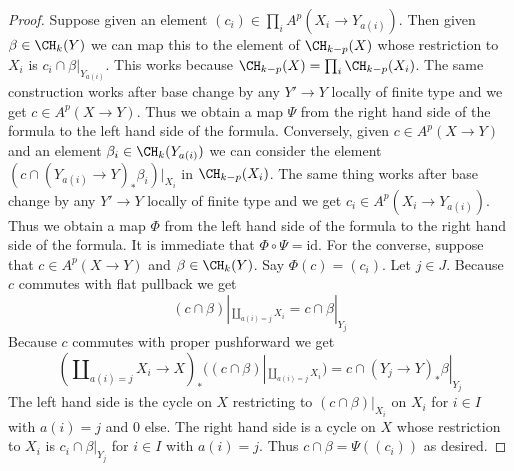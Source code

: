 \begin{proof}
Suppose given an element $(c_i) \in \prod_i A^p(X_i \to Y_{a(i)})$.
Then given $\beta \in \CH_k(Y)$ we can map this to the element of
$\CH_{k - p}(X)$ whose restriction to $X_i$ is $c_i \cap \beta|_{Y_{a(i)}}$.
This works because $\CH_{k - p}(X) = \prod_i \CH_{k - p}(X_i)$.
The same construction works after base change by any $Y' \to Y$
locally of finite type and we get $c \in A^p(X \to Y)$.
Thus we obtain a map $\Psi$ from the right hand side of the formula
to the left hand side of the formula.
Conversely, given $c \in A^p(X \to Y)$ and an element
$\beta_i \in \CH_k(Y_{a(i)})$ we can consider the element
$(c \cap (Y_{a(i)} \to Y)_*\beta_i)|_{X_i}$ in $\CH_{k - p}(X_i)$.
The same thing works after base change by any $Y' \to Y$
locally of finite type and we get $c_i \in A^p(X_i \to Y_{a(i)})$.
Thus we obtain a map $\Phi$ from the left hand
side of the formula to the right hand side of the formula.
It is immediate that $\Phi \circ \Psi = \text{id}$.
For the converse, suppose that $c \in A^p(X \to Y)$ and
$\beta \in \CH_k(Y)$. Say $\Phi(c) = (c_i)$. Let $j \in J$.
Because $c$ commutes with flat pullback we get
$$
(c \cap \beta)|_{\coprod_{a(i) = j} X_i} =
c \cap \beta|_{Y_j}
$$
Because $c$ commutes with proper pushforward we get
$$
(\coprod\nolimits_{a(i) = j} X_i \to X)_*
((c \cap \beta)|_{\coprod_{a(i) = j} X_i})
=
c \cap (Y_j \to Y)_*\beta|_{Y_j}
$$
The left hand side is the cycle on $X$ restricting to $(c \cap \beta)|_{X_i}$
on $X_i$ for $i \in I$ with $a(i) = j$ and $0$ else.
The right hand side is a cycle on $X$ whose restriction to $X_i$
is $c_i \cap \beta|_{Y_j}$ for $i \in I$ with $a(i) = j$.
Thus $c \cap \beta = \Psi((c_i))$ as desired.
\end{proof}


